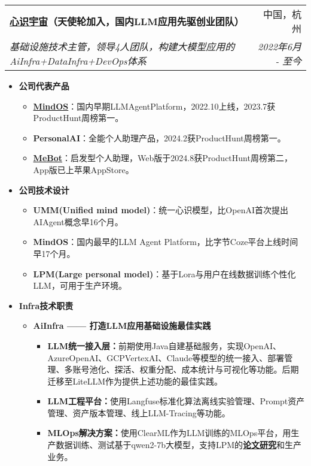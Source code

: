 \documentclass[letterpaper,11pt]{article}
\makeatletter
\newcommand{\resumeSubheading}[4]{
	\vspace{-1pt}\item
	\begin{tabular*}{0.97\textwidth}[t]{l@{\extracolsep{\fill}}r}
		\textbf{#1} & #2 \\
		\textit{\small#3} & \textit{\small #4} \\
	\end{tabular*}\vspace{-5pt}
}
\makeatother
\begin{document}
\begin{spacing}{1.0}
		\resumeSubheading
		{\href{https://home.mindos.com}{心识宇宙}（天使轮加入，国内LLM应用先驱创业团队）}{中国，杭州}
		{基础设施技术主管，领导4人团队，构建大模型应用的AiInfra+DataInfra+DevOps体系}{2022年6月 - 至今}
		\begin{itemize}
			\item \textbf{公司代表产品}
			\begin{itemize}
				\item \href{https://mindos.com}{\textbf{MindOS}}：国内早期LLMAgentPlatform，2022.10上线，2023.7获ProductHunt周榜第一。
				\item \textbf{PersonalAI}：全能个人助理产品，2024.2获ProductHunt周榜第一。
				\item \href{https://me.bot}{\textbf{MeBot}}：启发型个人助理，Web版于2024.8获ProductHunt周榜第二，App版已上苹果AppStore。
			\end{itemize}
			\item \textbf{公司技术设计}
			\begin{itemize}
			\item {\textbf{UMM(Unified mind model)}}：统一心识模型，比OpenAI首次提出AIAgent概念早16个月。
			\item {\textbf{MindOS}}：国内最早的LLM Agent Platform，比字节Coze平台上线时间早17个月。
			\item {\textbf{LPM(Large personal model)}}：基于Lora与用户在线数据训练个性化LLM，可用于生产环境。
			\end{itemize}
						
			\item \textbf{Infra技术职责}
			\begin{itemize}
				\item \textbf{AiInfra —— 打造LLM应用基础设施最佳实践}
				\begin{itemize}
					\item \textbf{LLM统一接入层：}前期使用Java自建基础服务，实现OpenAI、AzureOpenAI、GCPVertexAI、Claude等模型的统一接入、部署管理、多账号池化、探活、权重分配、成本统计与可视化等功能。后期迁移至LiteLLM作为提供上述功能的最佳实践。
					\item \textbf{LLM工程平台：}使用Langfuse标准化算法离线实验管理、Prompt资产管理、资产版本管理、线上LLM-Tracing等功能。
					\item \textbf{MLOps解决方案：}使用ClearML作为LLM训练的MLOps平台，用生产数据训练、测试基于qwen2-7b大模型，支持LPM的\href{https://arxiv.org/abs/2406.18312}{\textbf{论文研究}}和生产业务。
				\end{itemize}
				

\end{itemize}
\end{itemize}
\end{spacing}
\end{document}
